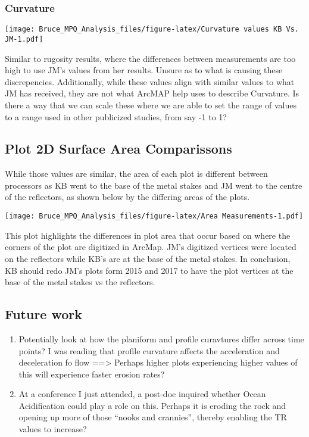 \documentclass[]{article}
\begin{document}
\hypertarget{curvature-4}{%
\subsubsection{Curvature}\label{curvature-4}}

\texttt{[image: Bruce\_MPQ\_Analysis\_files/figure-latex/Curvature values KB Vs. JM-1.pdf]}

Similar to rugosity results, where the differences between measurements
are too high to use JM's values from her results. Unsure as to what is
causing these discrepencies. Additionally, while these values align with
similar values to what JM has received, they are not what ArcMAP help
uses to describe Curvature. Is there a way that we can scale these where
we are able to set the range of values to a range used in other
publicized studies, from say -1 to 1?

\hypertarget{plot-2d-surface-area-comparissons}{%
\subsection{Plot 2D Surface Area
Comparissons}\label{plot-2d-surface-area-comparissons}}

While those values are similar, the area of each plot is different
between processors as KB went to the base of the metal stakes and JM
went to the centre of the reflectors, as shown below by the differing
areas of the plots.

\texttt{[image: Bruce\_MPQ\_Analysis\_files/figure-latex/Area Measurements-1.pdf]}

This plot highlights the differences in plot area that occur based on
where the corners of the plot are digitized in ArcMap. JM's digitized
vertices were located on the reflectors while KB's are at the base of
the metal stakes. In conclusion, KB should redo JM's plots form 2015 and
2017 to have the plot vertices at the base of the metal stakes vs the
reflectors.

\hypertarget{future-work}{%
\subsection{Future work}\label{future-work}}

\begin{enumerate}
\def\labelenumi{\arabic{enumi}.}
\item
  Potentially look at how the planiform and profile curavtures differ
  across time points? I was reading that profile curvature affects the
  acceleration and deceleration fo flow ==\textgreater{} Perhaps higher
  plots experiencing higher values of this will experience faster
  erosion rates?
\item
  At a conference I just attended, a post-doc inquired whether Ocean
  Acidification could play a role on this. Perhaps it is eroding the
  rock and opening up more of those ``nooks and crannies'', thereby
  enabling the TR values to increase?
\end{enumerate}
\end{document}
